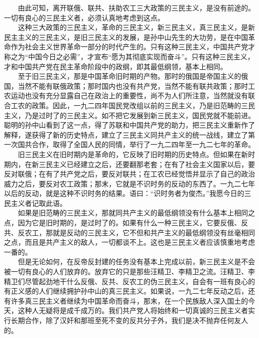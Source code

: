 \documentclass[cn,11pt,chinese]{elegantbook}
\begin{document}
　　由此可知，离开联俄、联共、扶助农工三大政策的三民主义，是没有前途的。一切有良心的三民主义者，必须认真地考虑到这点。\\
　　这种三大政策的三民主义，革命的三民主义，新三民主义，真三民主义，是新民主主义的三民主义，是旧三民主义的发展，是孙中山先生的大功劳，是在中国革命作为社会主义世界革命一部分的时代产生的。只有这种三民主义，中国共产党才称之为“中国今日之必需”，才宣布“愿为其彻底实现而奋斗”。只有这种三民主义，才和中国共产党在民主革命阶段中的政纲，即其最低纲领，基本上相同。\\
　　至于旧三民主义，那是中国革命旧时期的产物。那时的俄国是帝国主义的俄国，当然不能有联俄政策；那时国内也没有共产党，当然不能有联共政策；那时工农运动也没有充分显露自己在政治上的重要性，尚不为人们所注意，当然就没有联合工农的政策。因此，一九二四年国民党改组以前的三民主义，乃是旧范畴的三民主义，乃是过时了的三民主义。如不把它发展到新三民主义，国民党就不能前进。聪明的孙中山看到了这一点，得了苏联和中国共产党的助力，把三民主义重新作了解释，遂获得了新的历史特点，建立了三民主义同共产主义的统一战线，建立了第一次国共合作，取得了全国人民的同情，举行了一九二四年至一九二七年的革命。\\
　　旧三民主义在旧时期内是革命的，它反映了旧时期的历史特点。但如果在新时期内，在新三民主义已经建立之后，还要翻那老套；在有了社会主义国家以后，要反对联俄；在有了共产党之后，要反对联共；在工农已经觉悟并显示了自己的政治威力之后，要反对农工政策；那末，它就是不识时务的反动的东西了。一九二七年以后的反动，就是这种不识时务的结果。语曰：“识时务者为俊杰。”我愿今日的三民主义者记取此语。\\
　　如果是旧范畴的三民主义，那就同共产主义的最低纲领没有什么基本上相同之点，因为它是旧时期的，是过时了的。如果有什么一种三民主义，它要反俄、反共、反农工，那就是反动的三民主义，它不但和共产主义的最低纲领没有丝毫相同之点，而且是共产主义的敌人，一切都谈不上。这也是三民主义者应该慎重地考虑一番的。\\
　　但是无论如何，在反帝反封建的任务没有基本上完成以前，新三民主义是不会被一切有良心的人们放弃的。放弃它的只是那些汪精卫、李精卫之流。汪精卫、李精卫们尽管起劲地干什么反俄、反共、反农工的伪三民主义，自会有一班有良心的有正义感的人们继续拥护孙中山的真三民主义。如果说，一九二七年反动之后，还有许多真三民主义者继续为中国革命而奋斗，那末，在一个民族敌人深入国土的今天，这种人无疑将是成千成万的。我们共产党人将始终和一切真诚的三民主义者实行长期合作，除了汉奸和那班至死不变的反共分子外，我们是决不抛弃任何友人的。\\
\end{document}
